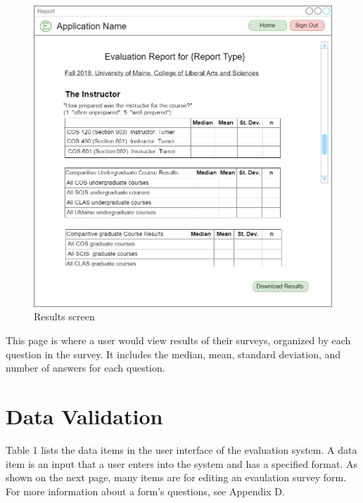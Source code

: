 \documentclass{article}
\begin{document}
\begin{center}
\begin{figure}[H]
    \centering
    \caption{Results screen}
    \includegraphics[scale=.35]{images/report_screen.png}
\end{figure}
\end{center}

This page is where a user would view results of their surveys, organized by each question in the survey. It includes the median, mean, standard deviation, and number of answers for each question.

\section{Data Validation}

Table 1 lists the data items in the user interface of the evaluation system. A data item is an input that a user enters into the system and has a specified format. As shown on the next page, many items are for editing an evaulation survey form. For more information about a form's questions, see Appendix D.
\end{document}
